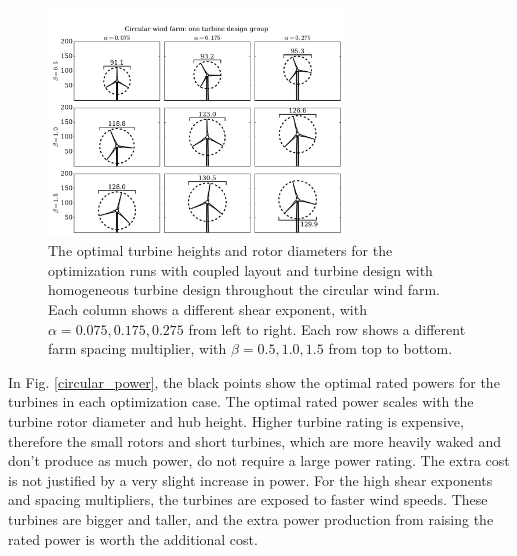 \documentclass[WESD, manuscript]{copernicus}
\begin{document}
\begin{figure}[htbp]
  \centering
  \includegraphics[trim={0.5cm 0.3cm 0.3cm 2.75cm},clip,width=0.7\textwidth]{Figures/turbineSizesCircular_1.pdf}
  \caption{\label{circular_turbines_1} The optimal turbine heights and rotor diameters for the optimization runs with coupled layout and turbine design with homogeneous turbine design throughout the circular wind farm. Each column shows a different shear exponent, with $\alpha=0.075,0.175,0.275$ from left to right. Each row shows a different farm spacing multiplier, with $\beta=0.5,1.0,1.5$ from top to bottom.}
\end{figure}


In Fig. \ref{circular_power}, the black points show the optimal rated powers for the turbines in each optimization case. The optimal rated power scales with the turbine rotor diameter and hub height. Higher turbine rating is expensive, therefore the small rotors and short turbines, which are more heavily waked and don't produce as much power, do not require a large power rating. The extra cost is not justified by a very slight increase in power. For the high shear exponents and spacing multipliers, the turbines are exposed to faster wind speeds. These turbines are bigger and taller, and the extra power production from raising the rated power is worth the additional cost.
\end{document}
